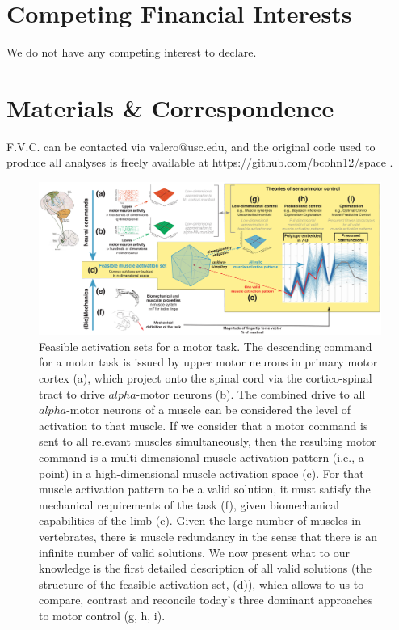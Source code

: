 \documentclass[10pt,letterpaper]{article}
\begin{document}
\section*{Competing Financial Interests}
We do not have any competing interest to declare.

\section*{Materials \& Correspondence}
F.V.C. can be contacted via valero@usc.edu, and the original code used to produce all analyses is freely available at https://github.com/bcohn12/space .

\nolinenumbers

%
%
% 



% 

\begin{figure}[htbp]
\centering
\includegraphics[width=1.0\textwidth]{numbered_figures/figure_1_overview.pdf}
\caption{Feasible activation sets for a motor task. The descending command for a motor task is issued by upper motor neurons in primary motor cortex (a), which project onto the spinal cord via the cortico-spinal tract to drive $alpha$-motor neurons (b). The combined drive to all $alpha$-motor neurons of a muscle can be considered the level of activation to that muscle.  If we consider that a motor command is sent to all relevant muscles simultaneously, then the resulting motor command is a  multi-dimensional muscle activation pattern (i.e., a point) in a high-dimensional muscle activation space \cite{Chao1978Graphical, spoor1983balancing, Kuo1993Human, Valero-Cuevas1998Large} (c). For that muscle activation pattern to be a valid solution, it must satisfy the mechanical requirements of the task (f), given biomechanical capabilities of the limb (e). Given the large number of muscles in vertebrates, there is muscle redundancy in the sense that there is an infinite number of valid solutions. We now present what to our knowledge is the first detailed description of all valid solutions (the structure of the feasible activation set, (d)), which allows to us to compare, contrast and reconcile today's three dominant approaches to motor control (g, h, i).}
\label{fig:overview}
\end{figure}
\end{document}
